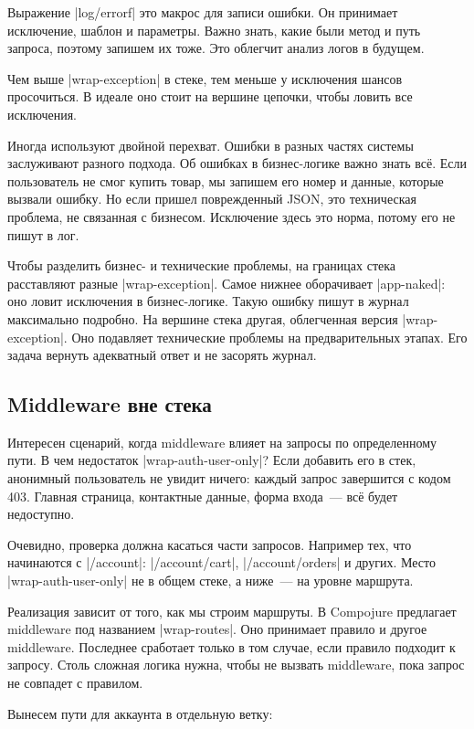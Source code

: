Выражение \spverb|log/errorf| это макрос для записи ошибки. Он принимает
исключение, шаблон и параметры. Важно знать, какие были метод и путь запроса,
поэтому запишем их тоже. Это облегчит анализ логов в будущем.

Чем выше \spverb|wrap-exception| в стеке, тем меньше у исключения шансов
просочиться. В идеале оно стоит на вершине цепочки, чтобы ловить все
исключения.

Иногда используют двойной перехват. Ошибки в разных частях системы заслуживают
разного подхода. Об ошибках в бизнес-логике важно знать вс\"{е}. Если пользователь
не смог купить товар, мы запишем его номер и данные, которые вызвали ошибку. Но
если пришел поврежденный JSON, это техническая проблема, не связанная с
бизнесом. Исключение здесь это норма, потому его не пишут в лог.

Чтобы разделить бизнес- и технические проблемы, на границах стека расставляют
разные \spverb|wrap-exception|. Самое нижнее оборачивает \spverb|app-naked|: оно
ловит исключения в бизнес-логике. Такую ошибку пишут в журнал максимально
подробно. На вершине стека другая, облегченная версия \spverb|wrap-exception|.
Оно подавляет технические проблемы на предварительных этапах. Его задача вернуть
адекватный ответ и не засорять журнал.

\subsection{Middleware вне стека}

Интересен сценарий, когда middleware влияет на запросы по определенному пути. В
чем недостаток \spverb|wrap-auth-user-only|? Если добавить его в стек, анонимный
пользователь не увидит ничего: каждый запрос завершится с кодом 403. Главная
страница, контактные данные, форма входа~--- вс\"{е} будет недоступно.

Очевидно, проверка должна касаться части запросов. Например тех, что начинаются
с \spverb|/account|: \spverb|/account/cart|, \spverb|/account/orders| и
других. Место \spverb|wrap-auth-user-only| не в общем стеке, а ниже~--- на
уровне маршрута.

Реализация зависит от того, как мы строим маршруты. В Compojure предлагает
middleware под названием \spverb|wrap-routes|. Оно принимает правило и другое
middleware. Последнее сработает только в том случае, если правило подходит к
запросу. Столь сложная логика нужна, чтобы не вызвать middleware, пока запрос не
совпадет с правилом.

Вынесем пути для аккаунта в отдельную ветку:

